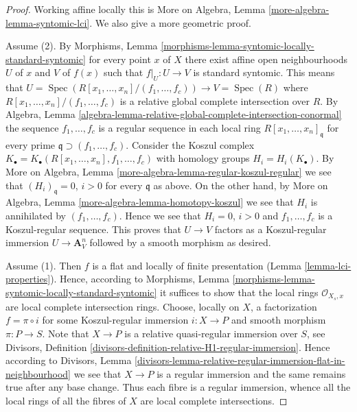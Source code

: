 \documentclass[10pt,a4paper]{amsart}
\theoremstyle{plain}
\theoremstyle{definition}
\theoremstyle{remark}
\numberwithin{equation}{subsection}
\def\Spec{\mathop{\mathrm{Spec}}}
\begin{document}
\begin{proof}
Working affine locally this is
More on Algebra, Lemma \ref{more-algebra-lemma-syntomic-lci}.
We also give a more geometric proof.

\medskip\noindent
Assume (2). By
Morphisms, Lemma \ref{morphisms-lemma-syntomic-locally-standard-syntomic}
for every point $x$ of $X$ there exist affine open neighbourhoods
$U$ of $x$ and $V$ of $f(x)$ such that $f|_U : U \to V$ is standard syntomic.
This means that $U = \Spec(R[x_1, \ldots, x_n]/(f_1, \ldots, f_c))
\to V = \Spec(R)$ where $R[x_1, \ldots, x_n]/(f_1, \ldots, f_c)$ is a
relative global complete intersection over $R$. By
Algebra,
Lemma \ref{algebra-lemma-relative-global-complete-intersection-conormal}
the sequence $f_1, \ldots, f_c$ is a regular sequence in each local
ring $R[x_1, \ldots, x_n]_{\mathfrak q}$ for every prime
$\mathfrak q \supset (f_1, \ldots, f_c)$. Consider the Koszul complex
$K_\bullet = K_\bullet(R[x_1, \ldots, x_n], f_1, \ldots, f_c)$
with homology groups $H_i = H_i(K_\bullet)$. By
More on Algebra, Lemma \ref{more-algebra-lemma-regular-koszul-regular}
we see that $(H_i)_{\mathfrak q} = 0$, $i > 0$ for every $\mathfrak q$
as above. On the other hand, by
More on Algebra, Lemma \ref{more-algebra-lemma-homotopy-koszul}
we see that $H_i$ is annihilated by $(f_1, \ldots, f_c)$. Hence we
see that $H_i = 0$, $i > 0$ and $f_1, \ldots, f_c$ is a Koszul-regular
sequence. This proves that $U \to V$ factors as a Koszul-regular
immersion $U \to \mathbf{A}^n_V$ followed by a smooth morphism as desired.

\medskip\noindent
Assume (1). Then $f$ is a flat and locally of finite presentation
(Lemma \ref{lemma-lci-properties}).
Hence, according to
Morphisms, Lemma \ref{morphisms-lemma-syntomic-locally-standard-syntomic}
it suffices to show that the local rings $\mathcal{O}_{X_s, x}$
are local complete intersection rings. Choose, locally on $X$, a factorization
$f = \pi \circ i$ for some Koszul-regular immersion $i : X \to P$
and smooth morphism $\pi : P \to S$. Note that $X \to P$ is
a relative quasi-regular immersion over $S$, see
Divisors, Definition \ref{divisors-definition-relative-H1-regular-immersion}.
Hence according to
Divisors,
Lemma \ref{divisors-lemma-relative-regular-immersion-flat-in-neighbourhood}
we see that $X \to P$ is a regular immersion and the same remains true
after any base change. Thus each fibre is a regular immersion, whence
all the local rings of all the fibres of $X$ are local complete intersections.
\end{proof}
\end{document}
